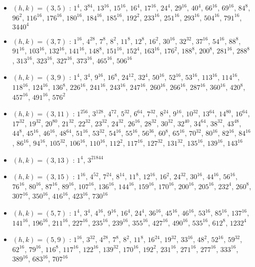 \begin{itemize}
\item $(h,k)=(3,5)$ : $1^{4}$, $3^{84}$, $13^{16}$, $15^{16}$, $16^{4}$, $17^{16}$, $24^{4}$, $29^{16}$, $40^{4}$, $66^{16}$, $69^{16}$, $84^{8}$, $96^{2}$, $116^{16}$, $176^{16}$, $180^{16}$, $184^{16}$, $185^{16}$, $192^{2}$, $233^{16}$, $251^{16}$, $293^{16}$, $504^{16}$, $791^{16}$, $3440^{4}$
\item $(h,k)=(3,7)$ : $1^{16}$, $4^{28}$, $7^{8}$, $8^{2}$, $11^{8}$, $12^{8}$, $16^{2}$, $30^{16}$, $32^{32}$, $37^{16}$, $54^{16}$, $88^{8}$, $91^{16}$, $103^{16}$, $132^{16}$, $141^{16}$, $148^{8}$, $151^{16}$, $152^{4}$, $163^{16}$, $176^{2}$, $188^{8}$, $200^{8}$, $281^{16}$, $288^{8}$, $313^{16}$, $323^{16}$, $327^{16}$, $373^{16}$, $465^{16}$, $506^{16}$
\item $(h,k)=(3,9)$ : $1^{4}$, $3^{4}$, $9^{16}$, $16^{8}$, $24^{12}$, $32^{4}$, $50^{16}$, $52^{16}$, $53^{16}$, $113^{16}$, $114^{16}$, $118^{16}$, $124^{16}$, $136^{8}$, $226^{16}$, $241^{16}$, $243^{16}$, $247^{16}$, $260^{16}$, $266^{16}$, $287^{16}$, $360^{16}$, $420^{8}$, $457^{16}$, $491^{16}$, $576^{2}$
\item $(h,k)=(3,11)$ : $1^{256}$, $3^{128}$, $4^{72}$, $5^{32}$, $6^{64}$, $7^{32}$, $8^{24}$, $9^{16}$, $10^{32}$, $13^{64}$, $14^{80}$, $16^{64}$, $17^{32}$, $19^{32}$, $20^{80}$, $21^{32}$, $22^{32}$, $23^{32}$, $24^{32}$, $26^{16}$, $28^{32}$, $30^{32}$, $32^{40}$, $34^{64}$, $38^{32}$, $43^{48}$, $44^{8}$, $45^{16}$, $46^{16}$, $48^{64}$, $51^{16}$, $53^{32}$, $54^{16}$, $55^{16}$, $56^{36}$, $60^{8}$, $65^{16}$, $70^{32}$, $80^{16}$, $82^{16}$, $84^{16}$, $86^{16}$, $94^{16}$, $105^{32}$, $106^{16}$, $110^{16}$, $112^{2}$, $117^{16}$, $127^{32}$, $131^{32}$, $135^{16}$, $139^{16}$, $143^{16}$
\item $(h,k)=(3,13)$ : $1^{4}$, $3^{21844}$
\item $(h,k)=(3,15)$ : $1^{16}$, $4^{52}$, $7^{24}$, $8^{14}$, $11^{8}$, $12^{16}$, $16^{2}$, $24^{32}$, $30^{16}$, $44^{16}$, $56^{16}$, $76^{16}$, $80^{16}$, $87^{16}$, $89^{16}$, $107^{16}$, $136^{16}$, $144^{16}$, $159^{16}$, $170^{16}$, $200^{16}$, $205^{16}$, $232^{4}$, $260^{8}$, $307^{16}$, $350^{16}$, $416^{16}$, $423^{16}$, $730^{16}$
\item $(h,k)=(5,7)$ : $1^{4}$, $3^{4}$, $4^{16}$, $9^{16}$, $16^{4}$, $24^{4}$, $36^{16}$, $45^{16}$, $46^{16}$, $53^{16}$, $85^{16}$, $137^{16}$, $141^{16}$, $196^{16}$, $211^{16}$, $227^{16}$, $235^{16}$, $239^{16}$, $355^{16}$, $427^{16}$, $490^{16}$, $535^{16}$, $612^{8}$, $1232^{4}$
\item $(h,k)=(5,9)$ : $1^{16}$, $3^{32}$, $4^{28}$, $7^{8}$, $8^{2}$, $11^{8}$, $16^{24}$, $19^{32}$, $33^{16}$, $48^{2}$, $52^{16}$, $59^{32}$, $62^{16}$, $79^{16}$, $116^{8}$, $117^{16}$, $122^{16}$, $139^{32}$, $170^{16}$, $192^{2}$, $231^{16}$, $271^{16}$, $277^{16}$, $333^{16}$, $389^{16}$, $683^{16}$, $707^{16}$

\end{itemize}
